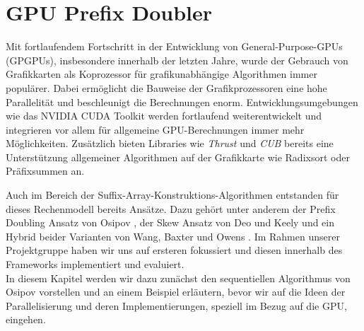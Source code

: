 \section{GPU Prefix Doubler}
\label{algorithm:gpuprefix}

Mit fortlaufendem Fortschritt in der Entwicklung von General-Purpose-GPUs (GPGPUs), insbesondere innerhalb der letzten Jahre, wurde der Gebrauch von Grafikkarten als Koprozessor für grafikunabhängige Algorithmen immer populärer. Dabei ermöglicht die Bauweise der Grafikprozessoren eine hohe Parallelität und beschleunigt die Berechnungen enorm. Entwicklungsumgebungen wie das NVIDIA CUDA Toolkit werden fortlaufend weiterentwickelt und integrieren vor allem für allgemeine GPU-Berechnungen immer mehr Möglichkeiten. Zusätzlich bieten Libraries wie \textit{Thrust} und \textit{CUB} bereits eine Unterstützung allgemeiner Algorithmen auf der Grafikkarte wie Radixsort oder Präfixsummen an.

Auch im Bereich der Suffix-Array-Konstruktions-Algorithmen entstanden für dieses Rechenmodell bereits Ansätze. Dazu gehört unter anderem der Prefix Doubling Ansatz von Osipov \cite{osipovGPU}, der Skew Ansatz von Deo und Keely \cite{deoGPU} und ein Hybrid beider Varianten von Wang, Baxter und Owens \cite{wangGPU}. Im Rahmen unserer Projektgruppe haben wir uns auf ersteren fokussiert und diesen innerhalb des Frameworks implementiert und evaluiert.\\
In diesem Kapitel werden wir dazu zunächst den sequentiellen Algorithmus von Osipov vorstellen und an einem Beispiel erläutern, bevor wir auf die Ideen der Parallelisierung und deren Implementierungen, speziell im Bezug auf die GPU, eingehen.
